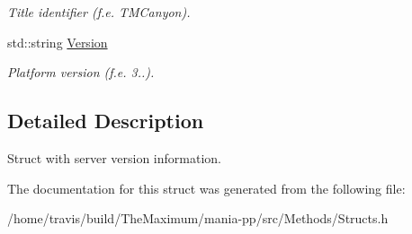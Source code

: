 \begin{DoxyCompactItemize}
\begin{DoxyCompactList}\small\item\em Title identifier (f.\-e. T\-M\-Canyon). \end{DoxyCompactList}\item 
\hypertarget{structServerVersion_ad831aec6294689dbe7f4d581795aa1ef}{std\-::string \hyperlink{structServerVersion_ad831aec6294689dbe7f4d581795aa1ef}{Version}}\label{structServerVersion_ad831aec6294689dbe7f4d581795aa1ef}

\begin{DoxyCompactList}\small\item\em Platform version (f.\-e. 3..). \end{DoxyCompactList}\end{DoxyCompactItemize}


\subsection{Detailed Description}
Struct with server version information. 

The documentation for this struct was generated from the following file\-:\begin{DoxyCompactItemize}
\item 
/home/travis/build/\-The\-Maximum/mania-\/pp/src/\-Methods/Structs.\-h\end{DoxyCompactItemize}
